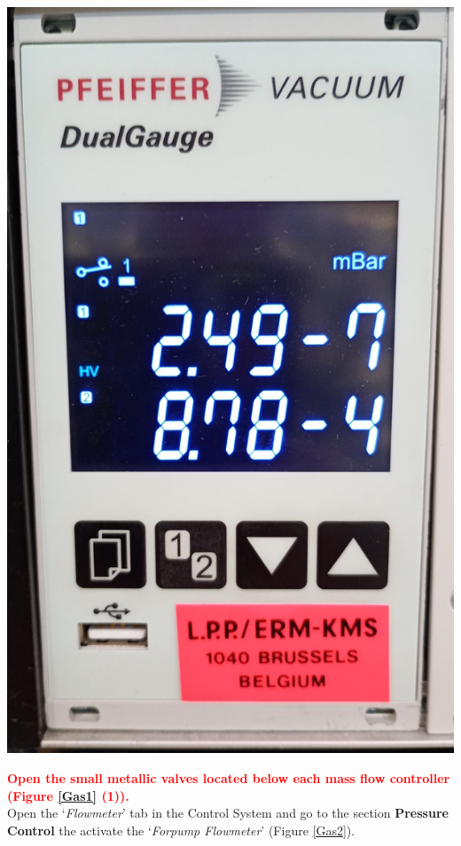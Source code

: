 \documentclass[fleqn,a4paper,20pt]{article}
\begin{document}
\begin{minipage}{.3\textwidth}
	\centering
	\includegraphics[width=\linewidth]{Pressure2}
\end{minipage}


\vspace{0.5cm}


\textcolor{red}{\textbf{Open the small metallic valves located below each mass flow controller (Figure \ref{Gas1} (1)).}}\\

Open the `\textit{Flowmeter}' tab in the Control System and go to the section \textbf{Pressure Control} the activate the `\textit{Forpump Flowmeter}' (Figure \ref{Gas2}).\\
\end{document}

